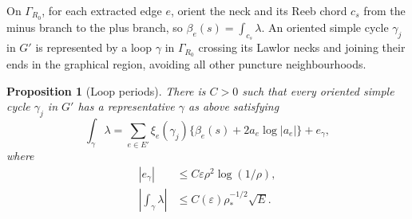 \documentclass[11pt,a4paper]{article}
\numberwithin{equation}{section}
\newtheorem{proposition}[theorem]{Proposition}
\theoremstyle{definition}
\theoremstyle{remark}
\begin{document}
	On $\Gamma_{R_0}$, for each extracted edge $e$, orient the neck
	and its Reeb chord $c_s$ from the minus branch to the plus branch,
	so $\beta_e(s)=\int_{c_s}\lambda$.
	An oriented simple cycle $\gamma_j$ in $G'$ is represented by a loop
	$\gamma$ in $\Gamma_{R_0}$ crossing its Lawlor necks and joining their
	ends in the graphical region, avoiding all other puncture neighbourhoods.
	
	\begin{proposition}[Loop periods]\label{prop:direct-period}
		There is $C>0$ such that every oriented simple cycle $\gamma_j$ in $G'$ has a representative
		$\gamma$ as above satisfying
		\begin{equation}\label{eqn:loop-period}
			\int_\gamma\lambda
			=\sum_{e\in E'} \xi_e(\gamma_j)
			\{\beta_e(s)+2a_e\log|a_e|\}+e_\gamma,
		\end{equation}
		where
		\[
		\begin{split}
			|e_\gamma|
			&\le C\varepsilon\rho^2\log(1/\rho),\\
			\left|\int_\gamma\lambda\right|
			&\le C(\varepsilon)\rho_*^{-1/2}\sqrt E.
		\end{split}
		\]
	\end{proposition}
	
\end{document}
